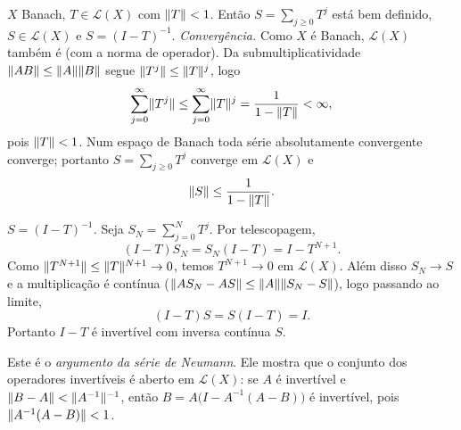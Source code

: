 \begin{exercicio}{$X$ Banach, $T\in\mathcal{L}(X)$ com $\lVert T\rVert<1$. Então $S=\sum_{j\ge0}T^j$ está bem definido, $S\in\mathcal{L}(X)$ e $S=(I-T)^{-1}$.}
\sol
\emph{Convergência.} Como $X$ é Banach, $\mathcal{L}(X)$ também é (com a norma de operador). Da submultiplicatividade $\lVert AB\rVert\le\lVert A\rVert\lVert B\rVert$ segue $\lVert T^j\rVert\le\lVert T\rVert^j$, logo
\[ \sum_{j=0}^{\infty}\lVert T^j\rVert\le\sum_{j=0}^{\infty}\lVert T\rVert^j=\frac{1}{1-\lVert T\rVert}<\infty, \]
pois $\lVert T\rVert<1$. Num espaço de Banach toda série absolutamente convergente converge; portanto $S=\sum_{j\ge0}T^j$ converge em $\mathcal{L}(X)$ e
\[ \lVert S\rVert\le\frac{1}{1-\lVert T\rVert}. \]

\emph{$S=(I-T)^{-1}$.} Seja $S_N=\sum_{j=0}^{N}T^j$. Por telescopagem,
\[ (I-T)S_N=S_N(I-T)=I-T^{N+1}. \]
Como $\lVert T^{N+1}\rVert\le\lVert T\rVert^{N+1}\to0$, temos $T^{N+1}\to0$ em $\mathcal{L}(X)$. Além disso $S_N\to S$ e a multiplicação é contínua ($\lVert AS_N-AS\rVert\le\lVert A\rVert\lVert S_N-S\rVert$), logo passando ao limite,
\[ (I-T)S=S(I-T)=I. \]
Portanto $I-T$ é invertível com inversa contínua $S$.

\begin{obs}
Este é o \emph{argumento da série de Neumann}. Ele mostra que o conjunto dos operadores invertíveis é aberto em $\mathcal{L}(X)$: se $A$ é invertível e $\lVert B-A\rVert<\lVert A^{-1}\rVert^{-1}$, então $B=A\bigl(I-A^{-1}(A-B)\bigr)$ é invertível, pois $\lVert A^{-1}(A-B)\rVert<1$.
\end{obs}
\end{exercicio}
